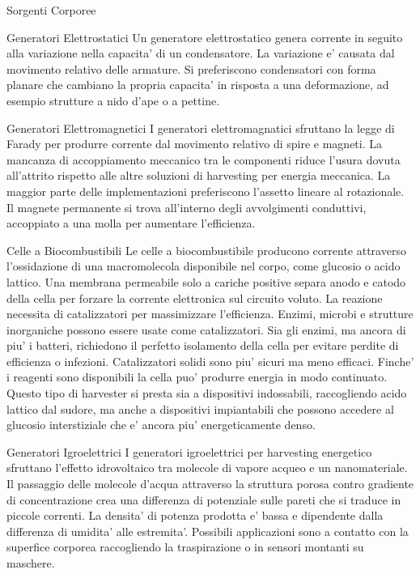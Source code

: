 \begin{section}{Sorgenti Corporee}
   \begin{subsection}{Generatori Elettrostatici}
    Un generatore elettrostatico genera corrente in seguito alla variazione nella capacita' di un condensatore. La variazione e' causata dal movimento relativo delle armature. Si preferiscono condensatori con forma planare che cambiano la propria capacita' in risposta a una deformazione, ad esempio strutture a nido d'ape o a pettine.
   \end{subsection}

   \begin{subsection}{Generatori Elettromagnetici}
    I generatori elettromagnatici sfruttano la legge di Farady per produrre corrente dal movimento relativo di spire e magneti. La mancanza di accoppiamento meccanico tra le componenti riduce l'usura dovuta all'attrito rispetto alle altre soluzioni di harvesting per energia meccanica. La maggior parte delle implementazioni preferiscono l'assetto lineare al rotazionale. Il magnete permanente si trova all'interno degli avvolgimenti conduttivi, accoppiato a una molla per aumentare l'efficienza.
   \end{subsection}
   
   \begin{subsection}{Celle a Biocombustibili}
    Le celle a biocombustibile producono corrente attraverso l'ossidazione di una macromolecola disponibile nel corpo, come glucosio o acido lattico. Una membrana permeabile solo a cariche positive separa anodo e catodo della cella per forzare la corrente elettronica sul circuito voluto. La reazione necessita di catalizzatori per massimizzare l'efficienza. Enzimi, microbi e strutture inorganiche possono essere usate come catalizzatori. Sia gli enzimi, ma ancora di piu' i batteri, richiedono il perfetto isolamento della cella per evitare perdite di efficienza o infezioni. Catalizzatori solidi sono piu' sicuri ma meno efficaci. Finche' i reagenti sono disponibili la cella puo' produrre energia in modo continuato. Questo tipo di harvester si presta sia a dispositivi indossabili, raccogliendo acido lattico dal sudore, ma anche a dispositivi impiantabili che possono accedere al glucosio interstiziale che e' ancora piu' energeticamente denso. 
   \end{subsection}

   \begin{subsection}{Generatori Igroelettrici}
    I generatori igroelettrici per harvesting energetico sfruttano l'effetto idrovoltaico tra molecole di vapore acqueo e un nanomateriale. Il passaggio delle molecole d'acqua attraverso la struttura porosa contro gradiente di concentrazione crea una differenza di potenziale sulle pareti che si traduce in piccole correnti. La densita' di potenza prodotta e' bassa e dipendente dalla differenza di umidita' alle estremita'. Possibili applicazioni sono a contatto con la superfice corporea raccogliendo la traspirazione o in sensori montanti su maschere. 
   \end{subsection}
\end{section}


